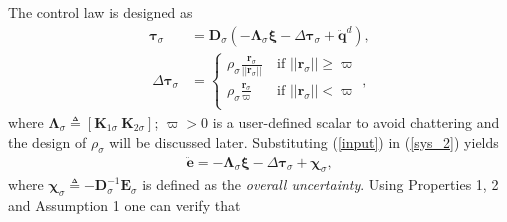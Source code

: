 \documentclass[AMA,STIX1COL,sort, compress]{WileyNJD-v2}
\begin{document}
The control law is designed as
\begin{subequations}\label{split_input}
	\begin{align} 
	\boldsymbol \tau_{\sigma} & = \mathbf D_\sigma (-\boldsymbol{\Lambda}_{\sigma} \boldsymbol{ \xi} -\Delta \boldsymbol \tau_{\sigma}+ \ddot{\mathbf{q}}^d),   \label{input}\\
	~ \Delta \boldsymbol \tau_{\sigma}&=\begin{cases}
	{\rho_\sigma}\frac{\mathbf r_\sigma}{|| \mathbf r_\sigma||}       & ~ \text{if } || \mathbf r_\sigma|| \geq \varpi\\
	{\rho_\sigma}\frac{\mathbf r_\sigma}{\varpi}        & ~ \text{if } || \mathbf r_\sigma || < \varpi\\
	\end{cases}, \label{rob}
	\end{align}
\end{subequations}
where $\boldsymbol \Lambda_{\sigma} \triangleq [\mathbf K_{1\sigma}~\mathbf K_{2\sigma}] $; $\varpi >0$ is a user-defined scalar to avoid chattering and the %
design of $\rho_\sigma$ will be discussed later.
Substituting (\ref{input}) in (\ref{sys_2}) yields
\begin{align}
\ddot{\mathbf e}  = -\boldsymbol{\Lambda}_{\sigma} \boldsymbol{ \xi} - \Delta \boldsymbol \tau_{\sigma}+\boldsymbol \chi_{\sigma}, \label{e_ddot}
\end{align}
where $\boldsymbol \chi_{\sigma} \triangleq -\mathbf D_\sigma^{-1} \mathbf{E}_{\sigma}$ is defined as the \emph{overall uncertainty}. Using Properties 1, 2 and Assumption 1 one can verify that 
\end{document}
